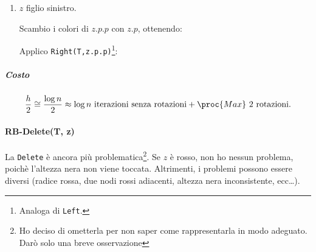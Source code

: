 \begin{enumerate}
\begin{enumerate}[label=($2.\arabic*$)]
        \item $z$ figlio sinistro. \label{rbinsert:2.2}
        \begin{center}
        \end{center}
        Scambio i colori di $z.p.p$ con $z.p$, ottenendo:
        \begin{center}
        \end{center}
        Applico \texttt{Right(T,z.p.p)}\footnote{Analoga di \texttt{Left}.}:
        \begin{center}
        \end{center}
    \end{enumerate}
\end{enumerate}




\subparagraph{Costo}
$$\frac{h}{2} \cong \frac{\log n}{2} \approx \log n \text{ iterazioni senza rotazioni}
    + \proc{Max} \text{ 2 rotazioni.}$$

\paragraph{RB-Delete(T, z)}
La \texttt{Delete} è ancora più problematica\footnote{Ho deciso di ometterla per non saper come rappresentarla in modo adeguato.%
Darò solo una breve osservazione}. Se $z$ è rosso, non ho nessun problema, poichè l'altezza nera non viene toccata.
Altrimenti, i problemi possono essere diversi (radice rossa, due nodi rossi adiacenti, altezza nera inconsistente, ecc\dots).